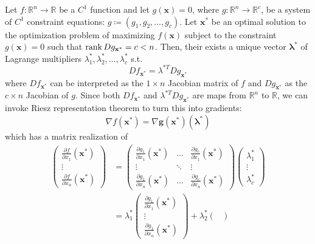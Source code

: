   \begin{theorem}
  Let $f: \mathbb{R}^n \longrightarrow \mathbb{R}$ be a $C^1$ function and let $g(\mathbf{x}) = 0$, where $g: \mathbb{R}^n \longrightarrow \mathbb{R}^c$, be a system of $C^1$ constraint equations: $g \coloneqq (g_1, g_2, \ldots, g_c)$. Let $\mathbf{x}^*$ be an optimal solution to the optimization problem of maximizing $f(\mathbf{x})$ subject to the constraint $g(\mathbf{x}) = 0$ such that $\rank D g_{\mathbf{x}^*} = c < n$. Then, their exists a unique vector $\boldsymbol{\lambda}^*$ of Lagrange multipliers $\lambda_1^*, \lambda_2^*, \ldots, \lambda_c^*$ s.t. 
  \[D f_{\mathbf{x}^*} = \lambda^{*T} D g_{\mathbf{x}^*}\]
  where $D f_{\mathbf{x}^*}$ can be interpreted as the $1 \times n$ Jacobian matrix of $f$ and $D g_{\mathbf{x}^*}$ as the $c \times n$ Jacobian of $g$. Since both $D f_{\mathbf{x}^*}$ and $\lambda^{*T} D g_{\mathbf{x}^*}$ are maps from $\mathbb{R}^n$ to $\mathbb{R}$, we can invoke Riesz representation theorem to turn this into gradients: 
  \[\nabla f(\mathbf{x}^*) = \nabla \mathbf{g}(\mathbf{x}^*) (\boldsymbol{\lambda}^*)\]
  which has a matrix realization of 
  \begin{align*}
  \begin{pmatrix}
  \frac{\partial f}{\partial x_1} (\mathbf{x}^*) \\ \vdots\\ \frac{\partial f}{\partial x_n} (\mathbf{x}^*) \end{pmatrix} & = \begin{pmatrix}
  \frac{\partial g_1}{\partial x_1} (\mathbf{x}^*)& \ldots & \frac{\partial g_c}{\partial x_1} (\mathbf{x}^*)\\
  \vdots & \ddots & \vdots \\
  \frac{\partial g_1}{\partial x_n} (\mathbf{x}^*)& \ldots & \frac{\partial g_c}{\partial x_n}(\mathbf{x}^*)
  \end{pmatrix} \begin{pmatrix}
  \lambda^*_1 \\ \vdots \\ \lambda^*_c \end{pmatrix} \\
  & = \lambda^*_1 \begin{pmatrix}
  \frac{\partial g_1}{\partial x_1} (\mathbf{x}^*) \\ \vdots \\ \frac{\partial g_1}{\partial x_n}(\mathbf{x}^*)
  \end{pmatrix} + \lambda^*_2 \begin{pmatrix}

\end{pmatrix}
\end{align*}
\end{theorem}
